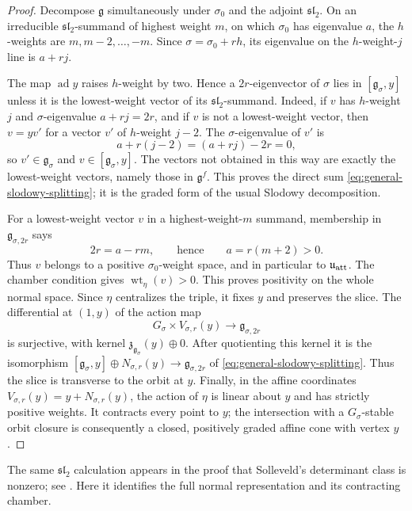 \documentclass[11pt]{amsart}
\theoremstyle{definition}
\theoremstyle{remark}
\begin{document}
\begin{proof}
Decompose $\mathfrak g$ simultaneously under $\sigma_0$ and the adjoint
$\mathfrak{sl}_2$.  On an irreducible $\mathfrak{sl}_2$-summand of highest
weight $m$, on which $\sigma_0$ has eigenvalue $a$, the $h$-weights are
$m,m-2,\ldots,-m$.  Since $\sigma=\sigma_0+rh$, its eigenvalue on the
$h$-weight-$j$ line is $a+rj$.

The map $\operatorname{ad}y$ raises $h$-weight by two.  Hence a
$2r$-eigenvector of $\sigma$ lies in
$[\mathfrak g_\sigma,y]$ unless it is the lowest-weight vector of its
$\mathfrak{sl}_2$-summand.  Indeed, if $v$ has $h$-weight $j$ and
$\sigma$-eigenvalue $a+rj=2r$, and if $v$ is not a lowest-weight vector,
then $v=yv'$ for a vector $v'$ of $h$-weight $j-2$.  The $\sigma$-eigenvalue
of $v'$ is
\[
 a+r(j-2)=(a+rj)-2r=0,
\]
so $v'\in\mathfrak g_\sigma$ and $v\in[\mathfrak g_\sigma,y]$.  The vectors
not obtained in this way are exactly the lowest-weight vectors, namely those
in $\mathfrak g^f$.  This proves the direct sum
\eqref{eq:general-slodowy-splitting}; it is the graded form of the usual
Slodowy decomposition.

For a lowest-weight vector $v$ in a highest-weight-$m$ summand, membership in
$\mathfrak g_{\sigma,2r}$ says
\[
 2r=a-rm,
 \qquad\text{hence}\qquad a=r(m+2)>0.
\]
Thus $v$ belongs to a positive $\sigma_0$-weight space, and in particular to
$\mathfrak u_{\rm att}$.  The chamber condition gives
$\operatorname{wt}_\eta(v)>0$.  This proves positivity on the whole normal
space.  Since $\eta$ centralizes the triple, it fixes $y$ and preserves the
slice.  The differential at $(1,y)$ of the action map
\[
 G_\sigma\times V_{\sigma,r}(y)\longrightarrow\mathfrak g_{\sigma,2r}
\]
is surjective, with kernel
$\mathfrak z_{\mathfrak g_\sigma}(y)\oplus0$.  After quotienting this
kernel it is the isomorphism
$[\mathfrak g_\sigma,y]\oplus N_{\sigma,r}(y)\to
\mathfrak g_{\sigma,2r}$ of \eqref{eq:general-slodowy-splitting}.  Thus the slice is transverse to the
orbit at $y$.  Finally, in the affine coordinates
$V_{\sigma,r}(y)=y+N_{\sigma,r}(y)$, the action of $\eta$ is linear about
$y$ and has strictly positive weights.  It contracts every point to $y$;
the intersection with a $G_\sigma$-stable orbit closure is consequently a
closed, positively graded affine cone with vertex $y$.
\end{proof}

The same $\mathfrak{sl}_2$ calculation appears in the proof that Solleveld's
determinant class is nonzero; see \cite[Appendix~B, Lemma~B.3]{Solleveld}.
Here it identifies the full normal representation and its contracting
chamber.
\end{document}
